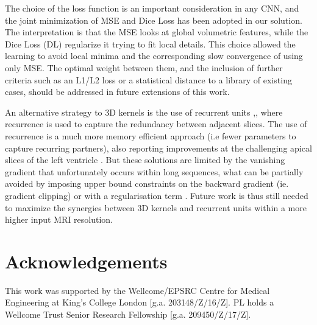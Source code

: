 \documentclass{llncs}
\begin{document}
The choice of the loss function is an important consideration in any CNN, and the joint minimization of MSE and Dice Loss has been adopted in our solution. The interpretation is that the MSE looks at global volumetric features, while the Dice Loss (DL) regularize it trying to fit local details. This choice allowed the learning to avoid local minima and the corresponding slow convergence of using only MSE. The optimal weight between them, and the inclusion of further criteria such as an L1/L2 loss or a statistical distance to a library of existing cases, should be addressed in future extensions of this work.

An alternative strategy to 3D kernels is the use of recurrent units \cite{Poudel},\cite{Jianxu},  where recurrence is used to capture the redundancy between adjacent slices. The use of recurrence is a much more memory efficient approach (i.e fewer parameters to capture recurring partners), also reporting improvements at the challenging apical slices of the left ventricle \cite{Poudel}. But these solutions are limited by the vanishing gradient that unfortunately occurs within long sequences, what can be partially avoided by imposing upper bound constraints on the backward gradient (ie. gradient clipping) or with a regularisation term \cite{Razvan}. Future work is thus still needed to maximize the synergies between 3D kernels and recurrent units within a more higher input MRI resolution.

\section*{Acknowledgements}

This work was supported by the Wellcome/EPSRC Centre for Medical Engineering at King’s College London [g.a. 203148/Z/16/Z]. PL holds a Wellcome Trust Senior Research Fellowship [g.a. 209450/Z/17/Z].
\end{document}
